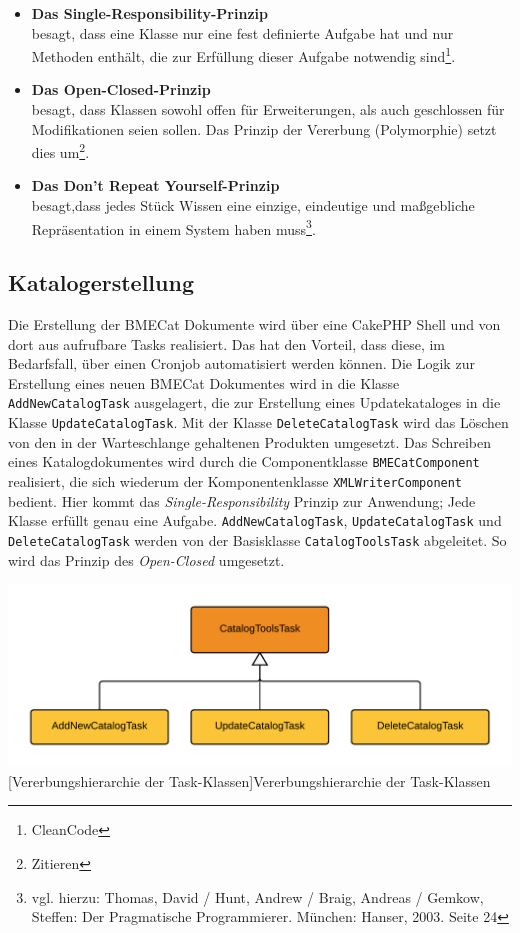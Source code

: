 	\begin{itemize}
	\item \textbf{Das Single-Responsibility-Prinzip}\\besagt, dass eine Klasse nur eine fest definierte Aufgabe hat und nur Methoden enthält, die zur Erfüllung dieser Aufgabe notwendig sind\footnote{CleanCode}. 
	\item \textbf{Das Open-Closed-Prinzip}\\ besagt, dass Klassen sowohl offen für Erweiterungen, als auch geschlossen für Modifikationen seien sollen. Das Prinzip der Vererbung (Polymorphie) setzt dies um\footnote{Zitieren}.
	\item \textbf{Das Don't Repeat Yourself-Prinzip}\\besagt,dass
	jedes Stück Wissen eine einzige, eindeutige und maßgebliche Repräsentation in einem System haben muss\footnote{vgl. hierzu: Thomas, David / Hunt, Andrew / Braig, Andreas / Gemkow, Steffen: Der Pragmatische Programmierer.
	München: Hanser, 2003. Seite 24}.
	\end{itemize}
	
	\subsection{Katalogerstellung}
	
	Die Erstellung der BMECat Dokumente wird über eine CakePHP Shell und von dort aus aufrufbare Tasks realisiert. Das hat den Vorteil, dass diese, im Bedarfsfall, über einen Cronjob automatisiert werden können.
	Die Logik zur Erstellung eines neuen BMECat Dokumentes wird in die Klasse \texttt{AddNewCatalogTask} ausgelagert, die zur Erstellung eines Updatekataloges in die Klasse 
	\texttt{UpdateCatalogTask}. Mit der Klasse \texttt{DeleteCatalogTask} wird das Löschen von den in der Warteschlange gehaltenen Produkten umgesetzt. Das Schreiben eines Katalogdokumentes wird durch die Componentklasse \texttt{BMECatComponent} realisiert, die sich wiederum der Komponentenklasse \texttt{XMLWriterComponent} bedient. Hier kommt das \textit{Single-Responsibility} Prinzip zur Anwendung; Jede Klasse erfüllt genau eine Aufgabe. \texttt{AddNewCatalogTask}, \texttt{UpdateCatalogTask} und \texttt{DeleteCatalogTask} werden von der Basisklasse \texttt{CatalogToolsTask} abgeleitet. So wird das Prinzip des \textit{Open-Closed} umgesetzt.

	\begin{minipage}{\linewidth}
		\vspace{1em}
		\centering
		\includegraphics[width=0.7 \linewidth]{img/VererbungShellSimple}
		[Vererbungshierarchie der Task-Klassen]{Vererbungshierarchie der Task-Klassen}
		\vspace{1em}
	\end{minipage}	
	
